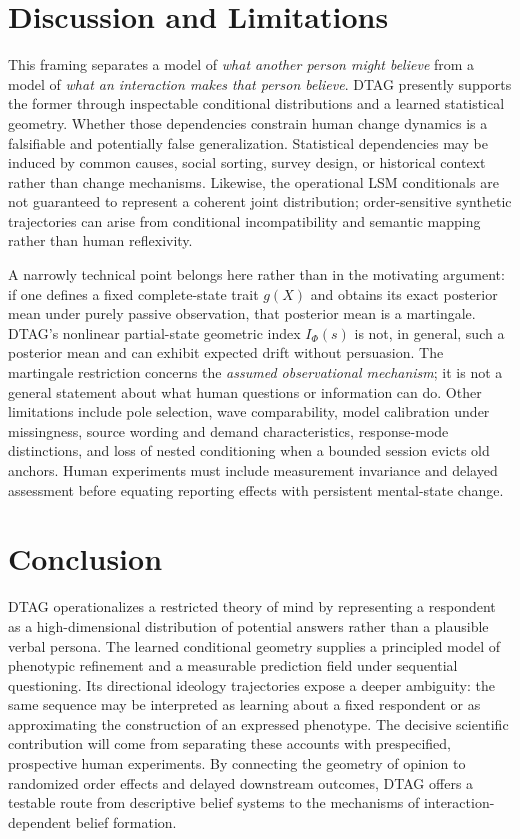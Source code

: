 \documentclass[journal,10pt]{IEEEtran}
\newcommand{\Ph}{\Phi}
\begin{document}
\section{Discussion and Limitations}
This framing separates a model of \emph{what another person might believe} from a model of \emph{what an interaction makes that person believe}. DTAG presently supports the former through inspectable conditional distributions and a learned statistical geometry. Whether those dependencies constrain human change dynamics is a falsifiable and potentially false generalization. Statistical dependencies may be induced by common causes, social sorting, survey design, or historical context rather than change mechanisms. Likewise, the operational LSM conditionals are not guaranteed to represent a coherent joint distribution; order-sensitive synthetic trajectories can arise from conditional incompatibility and semantic mapping rather than human reflexivity.

A narrowly technical point belongs here rather than in the motivating argument: if one defines a fixed complete-state trait $g(X)$ and obtains its exact posterior mean under purely passive observation, that posterior mean is a martingale. DTAG's nonlinear partial-state geometric index $I_\Ph(s)$ is not, in general, such a posterior mean and can exhibit expected drift without persuasion. The martingale restriction concerns the \emph{assumed observational mechanism}; it is not a general statement about what human questions or information can do. Other limitations include pole selection, wave comparability, model calibration under missingness, source wording and demand characteristics, response-mode distinctions, and loss of nested conditioning when a bounded session evicts old anchors. Human experiments must include measurement invariance and delayed assessment before equating reporting effects with persistent mental-state change.

\section{Conclusion}
DTAG operationalizes a restricted theory of mind by representing a respondent as a high-dimensional distribution of potential answers rather than a plausible verbal persona. The learned conditional geometry supplies a principled model of phenotypic refinement and a measurable prediction field under sequential questioning. Its directional ideology trajectories expose a deeper ambiguity: the same sequence may be interpreted as learning about a fixed respondent or as approximating the construction of an expressed phenotype. The decisive scientific contribution will come from separating these accounts with prespecified, prospective human experiments. By connecting the geometry of opinion to randomized order effects and delayed downstream outcomes, DTAG offers a testable route from descriptive belief systems to the mechanisms of interaction-dependent belief formation.



\end{document}
